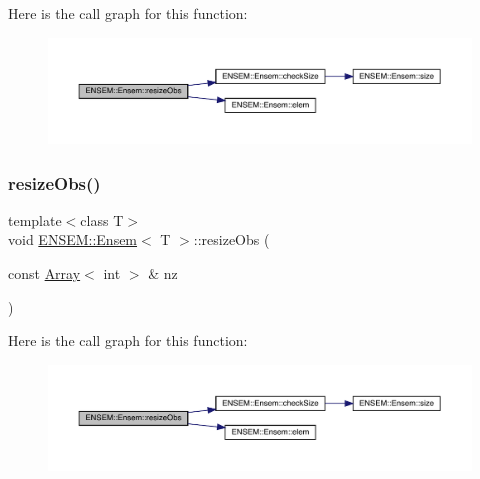 Here is the call graph for this function\+:
\nopagebreak
\begin{figure}[H]
\begin{center}
\leavevmode
\includegraphics[width=350pt]{d7/d3e/classENSEM_1_1Ensem_a4acf05018e5c49c0053dbe8cf76a4252_cgraph}
\end{center}
\end{figure}
\mbox{\label{classENSEM_1_1Ensem_a4acf05018e5c49c0053dbe8cf76a4252}} 
\subsubsection{\texorpdfstring{resizeObs()}{resizeObs()}\hspace{0.1cm}{\footnotesize\ttfamily [12/12]}}
{\footnotesize\ttfamily template$<$class T$>$ \\
void \mbox{\hyperlink{classENSEM_1_1Ensem}{E\+N\+S\+E\+M\+::\+Ensem}}$<$ T $>$\+::resize\+Obs (\begin{DoxyParamCaption}\item[{const \mbox{\hyperlink{classXMLArray_1_1Array}{Array}}$<$ int $>$ \&}]{nz }\end{DoxyParamCaption})\hspace{0.3cm}{\ttfamily [inline]}}

Here is the call graph for this function\+:
\nopagebreak
\begin{figure}[H]
\begin{center}
\leavevmode
\includegraphics[width=350pt]{d7/d3e/classENSEM_1_1Ensem_a4acf05018e5c49c0053dbe8cf76a4252_cgraph}
\end{center}
\end{figure}
\mbox{\label{classENSEM_1_1Ensem_a5fdfac362fd4347e4383b4e0a8537aec}} 
